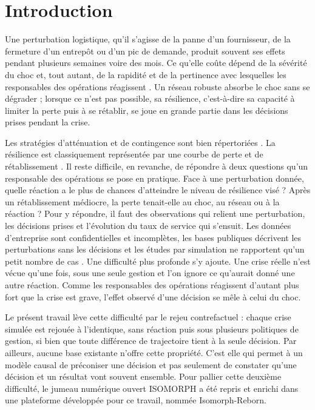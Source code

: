 \section{Introduction}
\label{sec:1}

Une perturbation logistique, qu'il s'agisse de la panne d'un fournisseur, de la fermeture d'un entrepôt ou d'un pic de demande, produit souvent ses effets pendant plusieurs semaines voire des mois. Ce qu'elle coûte dépend de la sévérité du choc et, tout autant, de la rapidité et de la pertinence avec lesquelles les responsables des opérations réagissent \citep{sheffi2005book,ivanov2019ijpr}. Un réseau robuste absorbe le choc sans se dégrader ; lorsque ce n'est pas possible, sa résilience, c'est-à-dire sa capacité à limiter la perte puis à se rétablir, se joue en grande partie dans les décisions prises pendant la crise.

Les stratégies d'atténuation et de contingence sont bien répertoriées \citep{tomlin2006,chopra2004}. La résilience est classiquement représentée par une courbe de perte et de rétablissement \citep{bruneau2003,rahiel2026in4pl}. Il reste difficile, en revanche, de répondre à deux questions qu'un responsable des opérations se pose en pratique. Face à une perturbation donnée, quelle réaction a le plus de chances d'atteindre le niveau de résilience visé ? Après un rétablissement médiocre, la perte tenait-elle au choc, au réseau ou à la réaction ? Pour y répondre, il faut des observations qui relient une perturbation, les décisions prises et l'évolution du taux de service qui s'ensuit. Les données d'entreprise sont confidentielles et incomplètes, les bases publiques décrivent les perturbations sans les décisions et les études par simulation ne rapportent qu'un petit nombre de cas \citep{ramzy2022,do2024}. Une difficulté plus profonde s'y ajoute. Une crise réelle n'est vécue qu'une fois, sous une seule gestion et l'on ignore ce qu'aurait donné une autre réaction. Comme les responsables des opérations réagissent d'autant plus fort que la crise est grave, l'effet observé d'une décision se mêle à celui du choc.

Le présent travail lève cette difficulté par le rejeu contrefactuel : chaque crise simulée est rejouée à l'identique, sans réaction puis sous plusieurs politiques de gestion, si bien que toute différence de trajectoire tient à la seule décision. Par ailleurs, aucune base existante n'offre cette propriété. C'est elle qui permet à un modèle causal de préconiser une décision et pas seulement de constater qu'une décision et un résultat vont souvent ensemble. Pour pallier cette deuxième difficulté, le jumeau numérique ouvert ISOMORPH \citep{zhang2026isomorph} a été repris et enrichi dans une plateforme développée pour ce travail, nommée Isomorph-Reborn. 

